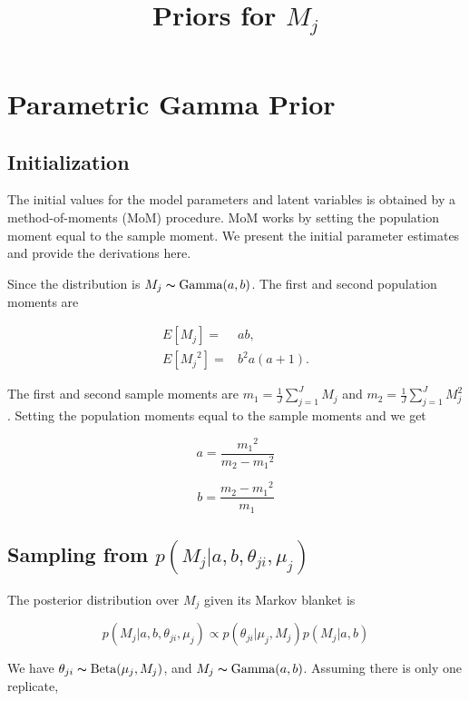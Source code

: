 \documentclass[11pt,reqno]{amsart}
\title[Priors]{Priors for $M_{j}$}
\author{}
\begin{document}
\maketitle

\section{Parametric Gamma Prior}
\subsection{Initialization}
The initial values for the model parameters and latent variables is obtained by a method-of-moments (MoM) procedure. MoM works by setting the population moment equal to the sample moment. We present the initial parameter estimates and provide the derivations here.

Since the distribution is $ M_{j} \thicksim \text{Gamma}(a, b)$. The first and second population moments are

\begin{eqnarray}
	E[M_{j}] =& a b,\\
	E[{M_{j}}^2] =& b^2 a (a+1).
\end{eqnarray}

The first and second sample moments are $m_1 = \frac{1}{J}\sum_{j=1}^J M_{j}$ and $m_2 = \frac{1}{J}\sum_{j=1}^J M_{j}^2$. Setting the population moments equal to the sample moments and we get

\begin{equation}
    a = \frac {{m_1}^2}{{m_2}-{m_1}^2}
\end{equation}

\begin{equation}
    b = \frac {{m_2}-{m_1}^2}{m_1}
\end{equation}

\subsection{Sampling from $p \left( M_{j} |a, b, \theta_{ji},\mu_j\right)$}
The posterior distribution over $M_{j}$ given its Markov blanket is

\begin{equation}
	p( M_{j} |a, b, \theta_{ji},\mu_j) \propto p(\theta_{ji} | \mu_j, M_j) p(M_{j} | a, b)
\end{equation}

We have $ \theta_{ji}\thicksim\text{Beta}(\mu_{j},M_{j})$, and $ M_{j} \thicksim \text{Gamma}(a, b)$. Assuming there is only one replicate,
\end{document}
